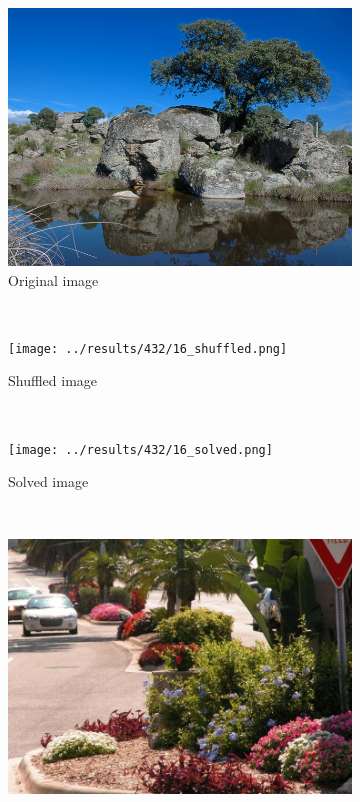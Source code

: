 \documentclass[11pt]{report}
\begin{document}
\begin{figure}
	\centering
	\begin{subfigure}[b]{0.3\textwidth}
		\includegraphics[width=\textwidth]{../imData/432/16.png}
		\caption{Original image}
	\end{subfigure}
	~
	\begin{subfigure}[b]{0.3\textwidth}
		\texttt{[image: ../results/432/16\_shuffled.png]}
		\caption{Shuffled image}
	\end{subfigure}
	~
	\begin{subfigure}[b]{0.3\textwidth}
		\texttt{[image: ../results/432/16\_solved.png]}
		\caption{Solved image}
	\end{subfigure}
  ~
  \begin{subfigure}[b]{0.3\textwidth}
		\includegraphics[width=\textwidth]{../imData/540/4.jpg}

\end{subfigure}
\end{figure}
\end{document}
